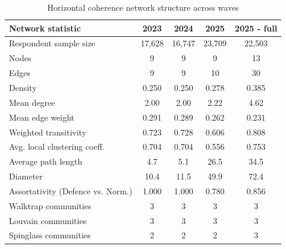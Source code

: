 \begin{table}[t]
\caption*{
{\fontsize{20}{25}\selectfont  Horizontal coherence network structure across waves\fontsize{10}{12}\selectfont }
} 
\fontsize{10.0pt}{12.0pt}\selectfont
\begin{tabular*}{\linewidth}{@{\extracolsep{\fill}}lcccc}
\toprule
{\bfseries Network statistic} & {\bfseries 2023} & {\bfseries 2024} & {\bfseries 2025} & {\bfseries 2025 - full} \\ 
\midrule\addlinespace[2.5pt]
Respondent sample size & 17,628 & 16,747 & 23,709 & 22,503 \\ 
Nodes & 9 & 9 & 9 & 13 \\ 
Edges & 9 & 9 & 10 & 30 \\ 
Density & 0.250 & 0.250 & 0.278 & 0.385 \\ 
Mean degree & 2.00 & 2.00 & 2.22 & 4.62 \\ 
Mean edge weight & 0.291 & 0.289 & 0.262 & 0.231 \\ 
Weighted transitivity & 0.723 & 0.728 & 0.606 & 0.808 \\ 
Avg. local clustering coeff. & 0.704 & 0.704 & 0.556 & 0.753 \\ 
Average path length & 4.7 & 5.1 & 26.5 & 34.5 \\ 
Diameter & 10.4 & 11.5 & 49.9 & 72.4 \\ 
Assortativity (Defence vs. Norm.) & 1.000 & 1.000 & 0.780 & 0.856 \\ 
Walktrap communities & 3 & 3 & 3 & 3 \\ 
Louvain communities & 3 & 3 & 3 & 3 \\ 
Spinglass communities & 2 & 2 & 2 & 3 \\ 
\bottomrule
\end{tabular*}
\end{table}

